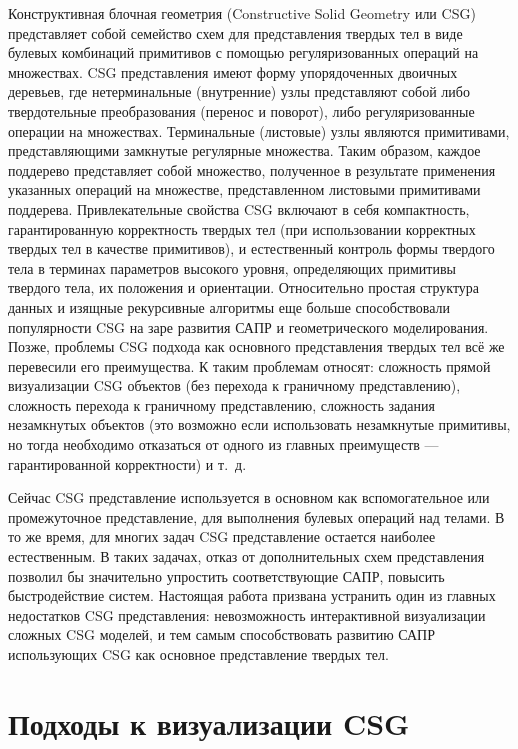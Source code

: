 Конструктивная блочная геометрия (Constructive Solid Geometry или CSG) представляет собой семейство схем для представления твердых тел в виде булевых комбинаций примитивов с помощью регуляризованных \cite{Requicha80} \cite{Requicha77} операций на множествах. CSG представления имеют форму упорядоченных двоичных деревьев, где нетерминальные (внутренние) узлы представляют собой либо твердотельные преобразования (перенос и поворот), либо регуляризованные операции на множествах. Терминальные (листовые) узлы являются примитивами, представляющими замкнутые регулярные множества. Таким образом, каждое поддерево представляет собой множество, полученное в результате применения указанных операций на множестве, представленном листовыми примитивами поддерева. Привлекательные свойства CSG включают в себя компактность, гарантированную корректность твердых тел (при использовании корректных твердых тел в качестве примитивов), и естественный контроль формы твердого тела в терминах параметров высокого уровня, определяющих примитивы твердого тела, их положения и ориентации. Относительно простая структура данных и изящные рекурсивные алгоритмы еще больше способствовали популярности CSG на заре развития САПР и геометрического моделирования. Позже, проблемы CSG подхода как основного представления твердых тел всё же перевесили его преимущества. К таким проблемам относят: сложность прямой визуализации CSG объектов (без перехода к граничному представлению), сложность перехода к граничному представлению, сложность задания незамкнутых объектов (это возможно если использовать незамкнутые примитивы, но тогда необходимо отказаться от одного из главных преимуществ — гарантированной корректности) и т. д.

Сейчас CSG представление используется в основном как вспомогательное или промежуточное представление, для выполнения булевых операций над телами. В то же время, для многих задач CSG представление остается наиболее естественным. В таких задачах, отказ от дополнительных схем представления позволил бы значительно упростить соответствующие САПР, повысить быстродействие систем. Настоящая работа призвана устранить один из главных недостатков CSG представления: невозможность интерактивной визуализации сложных CSG моделей, и тем самым способствовать развитию САПР использующих CSG как основное представление твердых тел.

\section{Подходы к визуализации CSG} \label{sect_csg_vis}

